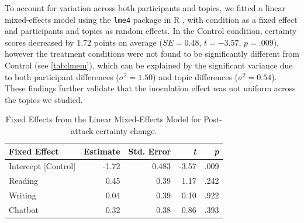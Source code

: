 \documentclass[sigconf]{acmart}
\begin{document}
To account for variation across both participants and topics, we fitted a linear mixed-effects model using the \texttt{lme4} package in R \cite{lme4}, with condition as a fixed effect and participants and topics as random effects.
In the Control condition, certainty scores decreased by 1.72 points on average ($SE = 0.48$, $t=-3.57$, $p=.009$), however the treatment conditions were not found to be significantly different from Control (see \autoref{tab:lmem}), which can be explained by the significant variance due to both participant differences ($\sigma^2 = 1.50$) and topic differences ($\sigma^2 = 0.54$).
These findings further validate that the inoculation effect was not uniform across the topics we studied.

\begin{table}[htpb]
\caption{Fixed Effects from the Linear Mixed-Effects Model for Post-attack certainty change.}
\label{tab:lmem}
\centering
\small
\begin{tabular}{lrrrr}
\toprule
\textbf{Fixed Effect} & \textbf{Estimate} & \textbf{Std. Error} & \textbf{\textit{t}} & \textbf{\textit{p}} \\
\midrule
Intercept [Control] & -1.72 & 0.483 & -3.57 & .009 \\
Reading & 0.45 & 0.39 & 1.17 & .242 \\
Writing & 0.04 & 0.39 & 0.10 & .922 \\
Chatbot & 0.32 & 0.38 & 0.86 & .393 \\
\bottomrule
\end{tabular}
\end{table}

\end{document}
